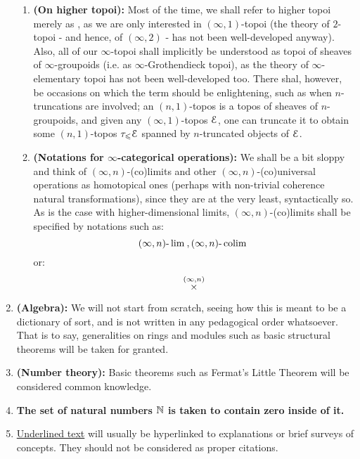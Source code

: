 \begin{enumerate}
\begin{enumerate}
                \item \textbf{(On higher topoi):} Most of the time, we shall refer to higher topoi merely as , as we are only interested in $(\infty, 1)$-topoi (the theory of $2$-topoi - and hence, of $(\infty, 2)$ - has not been well-developed anyway). Also, all of our $\infty$-topoi shall implicitly be understood as topoi of sheaves of $\infty$-groupoids (i.e. as $\infty$-Grothendieck topoi), as the theory of $\infty$-elementary topoi has not been well-developed too. There shal, however, be occasions on which the term  should be enlightening, such as when $n$-truncations are involved; an $(n, 1)$-topos is a topos of sheaves of $n$-groupoids, and given any $(\infty, 1)$-topos $\mathcal{E}$, one can truncate it to obtain some $(n, 1)$-topos $\tau_{\leqslant} \mathcal{E}$ spanned by $n$-truncated objects of $\mathcal{E}$. 
                \item \textbf{(Notations for $\infty$-categorical operations):} We shall be a bit sloppy and think of $(\infty, n)$-(co)limits and other $(\infty, n)$-(co)universal operations as homotopical ones (perhaps with non-trivial coherence natural transformations), since they are at the very least, syntactically so. As is the case with higher-dimensional limits, $(\infty, n)$-(co)limits shall be specified by notations such as:
                    $$(\infty, n)\text{-}\operatorname{lim} \:, (\infty, n)\text{-}\operatorname{colim} \:$$
                or:
                    $$\x^{(\infty, n)}$$
            \end{enumerate}
        \item \textbf{(Algebra):} We will not start from scratch, seeing how this is meant to be a dictionary of sort, and is not written in any pedagogical order whatsoever. That is to say, generalities on rings and modules such as basic structural theorems will be taken for granted.
        \item \textbf{(Number theory):} Basic theorems such as Fermat's Little Theorem will be considered common knowledge.
        \item \textbf{The set of natural numbers $\mathbb{N}$ is taken to contain zero inside of it.}
        \item \underline{Underlined text} will usually be hyperlinked to explanations or brief surveys of concepts. They should not be considered as proper citations.
    \end{enumerate}